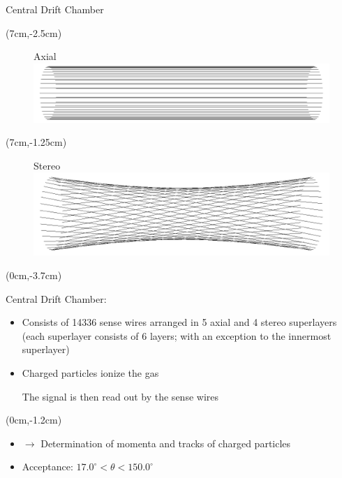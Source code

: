 \documentclass[8pt]{beamer}
\begin{document}
\begin{frame}{Central Drift Chamber}

	\begin{textblock*}{4cm}(7cm,-2.5cm)
		\begin{figure}
			Axial
			\includegraphics[width=\textwidth]{VBilder/axial}
		\end{figure}
	\end{textblock*}

	\begin{textblock*}{4cm}(7cm,-1.25cm)
		
		\begin{figure}
			Stereo
			\includegraphics[width=\textwidth]{VBilder/stereo}
		\end{figure}
	\end{textblock*}




	\begin{textblock*}{10cm}(0cm,-3.7cm)
	
		Central Drift Chamber:
		\begin{itemize}
			\item Consists of 14336 sense wires arranged in 5 axial and 4 stereo superlayers (each superlayer consists of 6 layers; with an exception to the innermost superlayer)
			\item Charged particles ionize the gas
			
			The signal is then read out by the sense wires  
			
		\end{itemize}
	\end{textblock*}
	
	
	\begin{textblock*}{6.5cm}(0cm,-1.2cm)
			
		\begin{itemize}	
			\item[] $\rightarrow$ Determination of momenta and tracks of charged particles
			\item Acceptance: $17.0^{\circ} < \theta < 150.0^{\circ}$ 
		\end{itemize}


\end{textblock*}
\end{frame}
\end{document}
